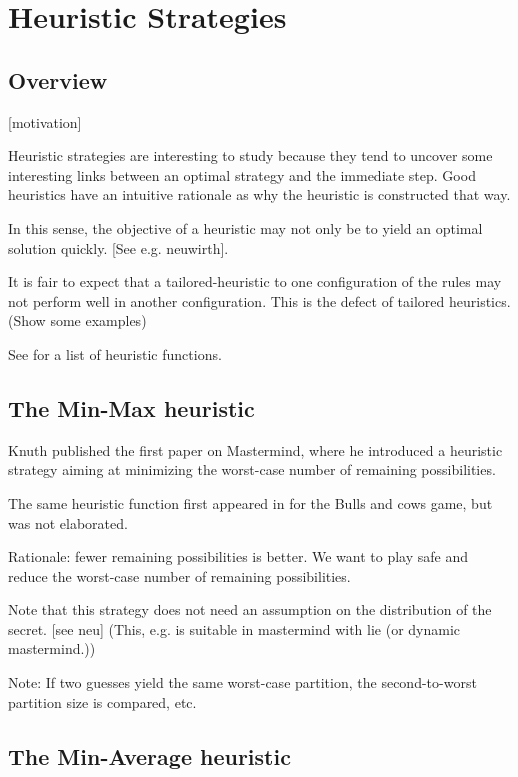 \chapter{Heuristic Strategies}

\section{Overview}

[motivation]

Heuristic strategies are interesting to study because they tend to uncover some interesting links between an optimal strategy and the immediate step. Good heuristics have an intuitive rationale as why the heuristic is constructed that way.

In this sense, the objective of a heuristic may not only be to yield an optimal solution quickly. [See e.g. neuwirth].

It is fair to expect that a tailored-heuristic to one configuration of the rules may not perform well in another configuration. This is the defect of tailored heuristics. (Show some examples)

See \cite{pepperdine10} for a list of heuristic functions.

\section{The Min-Max heuristic}

Knuth \cite{knuth76} published the first paper on Mastermind, where he introduced a heuristic strategy aiming at minimizing the worst-case number of remaining possibilities.

The same heuristic function first appeared in \cite{aleph71} for the Bulls and cows game, but was not elaborated.

Rationale: fewer remaining possibilities is better. We want to play safe and reduce the worst-case number of remaining possibilities. 

Note that this strategy does not need an assumption on the distribution of the secret. [see neu] (This, e.g. is suitable in mastermind with lie (or dynamic mastermind.))

Note: If two guesses yield the same worst-case partition, the second-to-worst partition size is compared, etc.

\section{The Min-Average heuristic}

